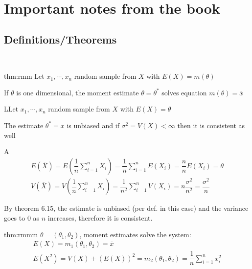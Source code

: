 \section{Important notes from the book}\par
\subsection{Definitions/Theorems}\hfill\\\par
\begin{theo}{thm:rmm}
  Let $x_1,\cdots,x_n$ random sample from $X$ with $E(X) = m(\theta)$\par
  \noindent If $\theta$ is one dimensional, the moment estimate $\theta = \theta^*$ solves equation $m(\theta) = \overline{x}$ 
\end{theo}
\par\bigskip
\begin{theo}
  LLet $x_1,\cdots,x_n$ random sample from $X$ with $E(X) = \theta$\par
  \noindent The estimate $\theta^* = \overline{x}$ is unbiased and if $\sigma^2 = V(X)<\infty$ then it is consistent as well 
\end{theo}
\par\bigskip
\begin{prf}
  A
  \begin{equation*}
    \begin{gathered}
      E(\overline{X}) = E\left(\dfrac{1}{n}\sum_{i=1}^{n}X_i\right) = \dfrac{1}{n}\sum_{i=1}^{n}E(X_i) = \dfrac{n}{n}E(X_i) = \theta\\
      V(\overline{X}) = V\left(\dfrac{1}{n}\sum_{i=1}^{n}X_i\right) = \dfrac{1}{n^2}\sum_{i=1}^{n}V(X_i) = n\dfrac{\sigma^2}{n^2} = \dfrac{\sigma^2}{n}
    \end{gathered}
  \end{equation*}\par
  \noindent By theorem 6.15, the estimate is unbiased (per def. in this case) and the variance goes to 0 as $n$ increases, therefore it is consistent. 
\end{prf}
\par\bigskip
\begin{theo}{thm:rmmm}
  $\theta = (\theta_1,\theta_2)$, moment estimates solve the system:
  \begin{equation*}
    \begin{gathered}
      E(X) = m_1(\theta_1, \theta_2) = \overline{x}\\
      E(X^2) = V(X) + (E(X))^2 = m_2(\theta_1,\theta_2) = \dfrac{1}{n}\sum_{i=1}^{n}x_i^2
    \end{gathered}
  \end{equation*}
\end{theo}
